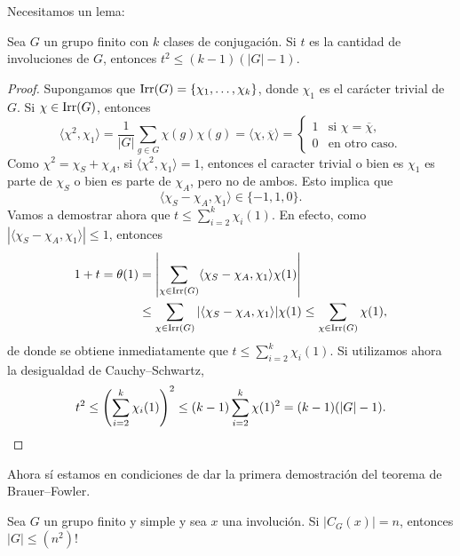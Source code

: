 Necesitamos un lema:

\begin{lemma}
Sea $G$ un grupo finito con $k$ clases de conjugación. 
Si $t$ es la cantidad de involuciones de $G$, entonces 
$t^2\leq (k-1)(|G|-1)$. 
\end{lemma}

\begin{proof}
Supongamos que $\operatorname{Irr}(G)=\{\chi_1,\dots,\chi_k\}$, donde $\chi_1$ es el 
carácter trivial de $G$. 
Si $\chi\in\operatorname{Irr}(G)$, entonces
\[
\langle\chi^2,\chi_1\rangle=\frac{1}{|G|}\sum_{g\in G}\chi(g)\chi(g)=\langle\chi,\overline{\chi}\rangle=\begin{cases}
1 & \text{si $\chi=\overline{\chi}$},\\
0 & \text{en otro caso}.
\end{cases}
\]
Como $\chi^2=\chi_S+\chi_A$, si $\langle\chi^2,\chi_1\rangle=1$, entonces el caracter trivial 
o bien es $\chi_1$ es parte de $\chi_S$ o bien es parte de $\chi_A$, pero no de ambos. Esto implica que
\[
\langle\chi_S-\chi_A,\chi_1\rangle\in\{-1,1,0\}.
\]
Vamos a demostrar ahora que 
$t\leq\sum_{i=2}^k\chi_i(1)$. En efecto, 
como $|\langle\chi_S-\chi_A,\chi_1\rangle|\leq 1$, 
entonces 
\begin{align*}
1+t=\theta(1)
&=\left|\sum_{\chi\in\operatorname{Irr}(G)}\langle\chi_S-\chi_A,\chi_1\rangle\chi(1)\right|\\
&\leq\sum_{\chi\in\operatorname{Irr}(G)}|\langle\chi_S-\chi_A,\chi_1\rangle|\chi(1)
\leq\sum_{\chi\in\operatorname{Irr}(G)}\chi(1),
\end{align*}
de donde se obtiene inmediatamente que $t\leq\sum_{i=2}^k\chi_i(1)$. 
Si utilizamos ahora 
la desigualdad de Cauchy--Schwartz, 
\[
t^2\leq\left(\sum_{i=2}^k\chi_i(1)\right)^2
\leq(k-1)\sum_{i=2}^k\chi(1)^2=(k-1)(|G|-1).\qedhere
\]
\end{proof}

Ahora sí estamos en condiciones de dar la primera demostración del teorema de
Brauer--Fowler. 

\begin{theorem}
Sea $G$ un grupo finito y simple y sea $x$ una involución. Si $|C_G(x)|=n$, entonces $|G|\leq (n^2)!$	
\end{theorem}

